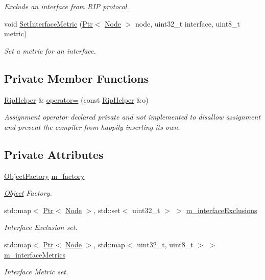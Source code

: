 \begin{DoxyCompactItemize}
\begin{DoxyCompactList}\small\item\em Exclude an interface from R\+IP protocol. \end{DoxyCompactList}\item 
void \hyperlink{classns3_1_1RipHelper_ac04882a6293036d9cc97139f54c6c889}{Set\+Interface\+Metric} (\hyperlink{classns3_1_1Ptr}{Ptr}$<$ \hyperlink{classns3_1_1Node}{Node} $>$ node, uint32\+\_\+t interface, uint8\+\_\+t metric)
\begin{DoxyCompactList}\small\item\em Set a metric for an interface. \end{DoxyCompactList}\end{DoxyCompactItemize}
\subsection*{Private Member Functions}
\begin{DoxyCompactItemize}
\item 
\hyperlink{classns3_1_1RipHelper}{Rip\+Helper} \& \hyperlink{classns3_1_1RipHelper_a7be2c685132f7aeaed59d7c7fddc3da9}{operator=} (const \hyperlink{classns3_1_1RipHelper}{Rip\+Helper} \&o)
\begin{DoxyCompactList}\small\item\em Assignment operator declared private and not implemented to disallow assignment and prevent the compiler from happily inserting its own. \end{DoxyCompactList}\end{DoxyCompactItemize}
\subsection*{Private Attributes}
\begin{DoxyCompactItemize}
\item 
\hyperlink{classns3_1_1ObjectFactory}{Object\+Factory} \hyperlink{classns3_1_1RipHelper_ae6737890612fb5a8469ff9a911512190}{m\+\_\+factory}
\begin{DoxyCompactList}\small\item\em \hyperlink{classns3_1_1Object}{Object} Factory. \end{DoxyCompactList}\item 
std\+::map$<$ \hyperlink{classns3_1_1Ptr}{Ptr}$<$ \hyperlink{classns3_1_1Node}{Node} $>$, std\+::set$<$ uint32\+\_\+t $>$ $>$ \hyperlink{classns3_1_1RipHelper_a7615bc949f0c5d908b75d5af40a40e12}{m\+\_\+interface\+Exclusions}
\begin{DoxyCompactList}\small\item\em Interface Exclusion set. \end{DoxyCompactList}\item 
std\+::map$<$ \hyperlink{classns3_1_1Ptr}{Ptr}$<$ \hyperlink{classns3_1_1Node}{Node} $>$, std\+::map$<$ uint32\+\_\+t, uint8\+\_\+t $>$ $>$ \hyperlink{classns3_1_1RipHelper_a61fdf6837031cb851e1e85b6f7feab61}{m\+\_\+interface\+Metrics}
\begin{DoxyCompactList}\small\item\em Interface Metric set. \end{DoxyCompactList}\end{DoxyCompactItemize}
